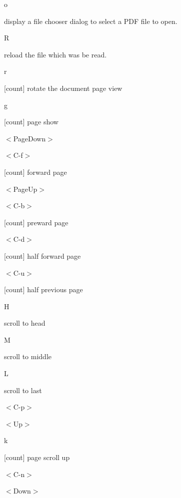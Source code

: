 \documentclass[a4paper,12pt]{article}
\begin{document}
\begin{description}

\item o

display a file chooser dialog to select a PDF file to open.

\item R

reload the file which was be read.

\item r

[count] rotate the document page view

\item g

[count] page show

\item $<$PageDown$>$

\item $<$C-f$>$

[count] forward page 

\item $<$PageUp$>$

\item $<$C-b$>$

[count] preward page 

\item $<$C-d$>$

[count] half forward page 

\item $<$C-u$>$

[count] half previous page 

\item H

scroll to head

\item M

scroll to middle

\item L

scroll to last

\item $<$C-p$>$

\item $<$Up$>$

\item k

[count] page scroll up

\item $<$C-n$>$

\item $<$Down$>$


\end{description}
\end{document}
